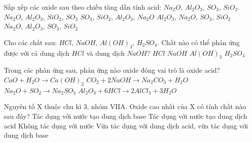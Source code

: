 \begin{ex}
	Sắp xếp các oxide sau theo chiều tăng dần tính acid: $Na_2O$, $Al_2O_3$, $SO_3$, $SiO_2$.
	\choice
	{$Na_2O$, $Al_2O_3$, $SiO_2$, $SO_3$}
	{$SO_3$, $SiO_2$, $Al_2O_3$, $Na_2O$}
	{$Al_2O_3$, $Na_2O$, $SO_3$, $SiO_2$}
	{\True $Na_2O$, $Al_2O_3$, $SO_3$, $SiO_2$}
\end{ex}
\begin{ex}
	Cho các chất sau: $HCl$, $NaOH$, $Al(OH)_3$, $H_2SO_4$. Chất nào có thể phản ứng được với cả dung dịch $HCl$ và dung dịch $NaOH$?
	\choice
	{$HCl$}
	{$NaOH$}
	{\True $Al(OH)_3$}
	{$H_2SO_4$}
\end{ex}
\begin{ex}
	Trong các phản ứng sau, phản ứng nào oxide đóng vai trò là oxide acid?
	\choice
	{$CaO + H_2O \longrightarrow Ca(OH)_2$}
	{\True $CO_2 + 2NaOH \longrightarrow Na_2CO_3 + H_2O$}
	{$Na_2O + SO_2 \longrightarrow Na_2SO_3$}
	{$Al_2O_3 + 6HCl \longrightarrow 2AlCl_3 + 3H_2O$}
\end{ex}
\begin{ex}
	Nguyên tố X thuộc chu kì 3, nhóm VIIA. Oxide cao nhất của X có tính chất nào sau đây?
	\choice
	{Tác dụng với nước tạo dung dịch base}
	{\True Tác dụng với nước tạo dung dịch acid}
	{Không tác dụng với nước}
	{Vừa tác dụng với dung dịch acid, vừa tác dụng với dung dịch base}
\end{ex}


